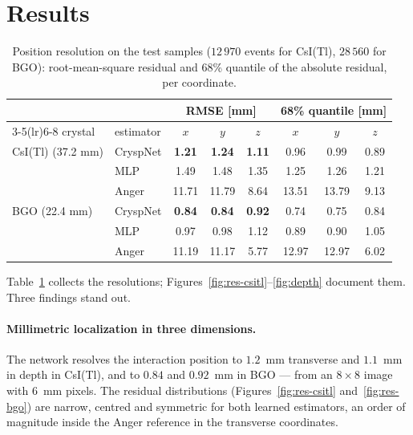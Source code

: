 \documentclass[11pt,a4paper]{article}
\newcommand{\csitl}{CsI(Tl)}
\begin{document}
\section{Results}
\label{sec:results}

\begin{table}[htbp]
\centering
\begin{tabular}{llcccccc}
  \toprule
  & & \multicolumn{3}{c}{RMSE [mm]} & \multicolumn{3}{c}{68\% quantile [mm]} \\
  \cmidrule(lr){3-5}\cmidrule(lr){6-8}
  crystal & estimator & $x$ & $y$ & $z$ & $x$ & $y$ & $z$ \\
  \midrule
  \csitl{} (37.2 mm) & CryspNet & \textbf{1.21} & \textbf{1.24} & \textbf{1.11} & 0.96 & 0.99 & 0.89 \\
                     & MLP      & 1.49 & 1.48 & 1.35 & 1.25 & 1.26 & 1.21 \\
                     & Anger    & 11.71 & 11.79 & 8.64 & 13.51 & 13.79 & 9.13 \\
  \midrule
  BGO (22.4 mm)      & CryspNet & \textbf{0.84} & \textbf{0.84} & \textbf{0.92} & 0.74 & 0.75 & 0.84 \\
                     & MLP      & 0.97 & 0.98 & 1.12 & 0.89 & 0.90 & 1.05 \\
                     & Anger    & 11.19 & 11.17 & 5.77 & 12.97 & 12.97 & 6.02 \\
  \bottomrule
\end{tabular}
\caption{Position resolution on the test samples ($12\,970$ events for
\csitl{}, $28\,560$ for BGO): root-mean-square residual and 68\% quantile of
the absolute residual, per coordinate.}
\label{tab:results}
\end{table}

Table~\ref{tab:results} collects the resolutions;
Figures~\ref{fig:res-csitl}--\ref{fig:depth} document them. Three findings
stand out.

\paragraph{Millimetric localization in three dimensions.} The network resolves
the interaction position to $1.2$~mm transverse and $1.1$~mm in depth in
\csitl{}, and to $0.84$ and $0.92$~mm in BGO --- from an $8\times8$ image with
6~mm pixels. The residual distributions (Figures~\ref{fig:res-csitl}
and~\ref{fig:res-bgo}) are narrow, centred and symmetric for both learned
estimators, an order of magnitude inside the Anger reference in the transverse
coordinates.
\end{document}
